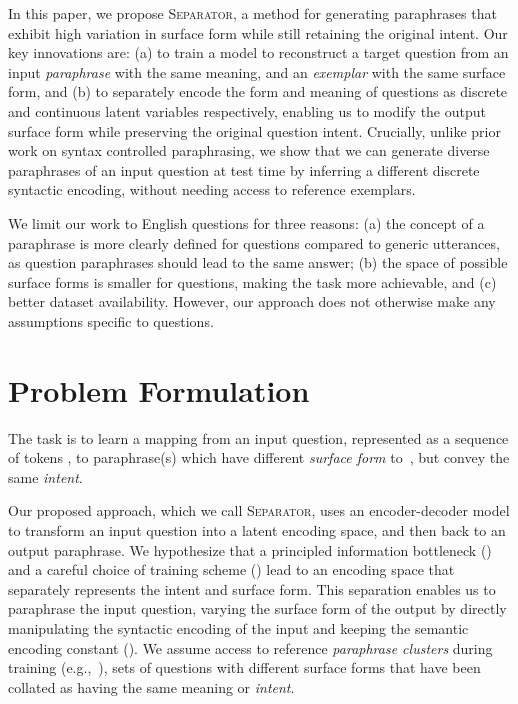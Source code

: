 \documentclass[11pt,a4paper]{article}
\begin{document}
In this paper, we propose \textsc{Separator}, a method for generating
paraphrases that exhibit high variation in surface form while still
retaining the original intent. Our key innovations are: (a) to train a model
to reconstruct a target question from an input \textit{paraphrase} with the same
meaning, and an \textit{exemplar} with the same surface form, and (b) to separately encode the form and meaning of
questions as discrete and continuous latent variables respectively, enabling us to modify the output surface form
while preserving the original question intent.   Crucially, unlike
prior work on syntax controlled paraphrasing, we show that we can
generate diverse paraphrases of an input question at test time by
inferring a different discrete syntactic encoding, without needing access to
reference exemplars. 


We limit our work to English questions for three reasons: (a) the concept of a
paraphrase is more clearly defined for questions compared to generic
utterances, as question paraphrases should lead to the same answer;
(b) the space of possible surface forms is smaller for questions,
making the task more achievable, and (c) better dataset
availability. However, our approach does not otherwise make any
assumptions specific to questions.












\section{Problem Formulation}









The task is to learn a mapping from an input question, represented as
a sequence of tokens , to paraphrase(s)  which
have different \textit{surface form} to~, but convey the
same \textit{intent}.

Our proposed approach, which we call \mbox{\textsc{Separator}}, uses an
encoder-decoder model to transform an input question into a latent
encoding space, and then back to an output paraphrase. We hypothesize
that a principled information bottleneck () and a
careful choice of training scheme () lead to an
encoding space that separately represents the intent and surface
form. This separation enables us to paraphrase the input question,
varying the surface form of the output by directly manipulating the
syntactic encoding of the input and keeping the semantic encoding
constant (). We assume access to reference
\textit{paraphrase clusters} during training (e.g.,~),
sets of questions with different surface forms that have been collated
as having the same meaning or \textit{intent}.
\end{document}
